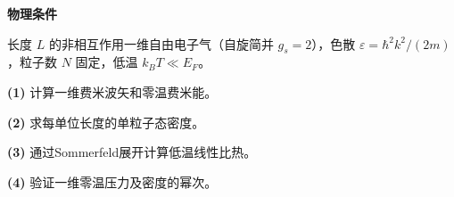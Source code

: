 \textbf{物理条件}\par 长度 \(L\) 的非相互作用一维自由电子气（自旋简并 \(g_s=2\)），色散 \(\varepsilon=\hbar^2k^2/(2m)\)，粒子数 \(N\) 固定，低温 \(k_BT\ll E_F\)。
\par\noindent\textbf{(1)} 计算一维费米波矢和零温费米能。
\par\noindent\textbf{(2)} 求每单位长度的单粒子态密度。
\par\noindent\textbf{(3)} 通过Sommerfeld展开计算低温线性比热。
\par\noindent\textbf{(4)} 验证一维零温压力及密度的幂次。

